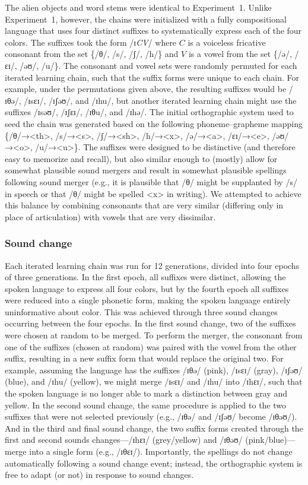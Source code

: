 \documentclass[doc,biblatex]{apa7}
\begin{document}
The alien objects and word stems were identical to Experiment~1. Unlike Experiment~1, however, the chains were initialized with a fully compositional language that uses four distinct suffixes to systematically express each of the four colors. The suffixes took the form /ɪ\textit{CV}/ where $C$ is a voiceless fricative consonant from the set \{/θ/, /s/, /ʃ/, /h/\} and $V$ is a vowel from the set \{/ə/, /ɛɪ/, /əʊ/, /u/\}. The consonant and vowel sets were randomly permuted for each iterated learning chain, such that the suffix forms were unique to each chain. For example, under the permutations given above, the resulting suffixes would be /ɪθə/, /ɪsɛɪ/, /ɪʃəʊ/, and /ɪhu/, but another iterated learning chain might use the suffixes /ɪsəʊ/, /ɪʃɛɪ/, /ɪθu/, and /ɪhə/. The initial orthographic system used to seed the chain was generated based on the following phoneme–grapheme mapping \{/θ/→<th>, /s/→<s>, /ʃ/→<sh>, /h/→<x>, /ə/→<a>, /ɛɪ/→<e>, /əʊ/→<o>, /u/→<u>\}. The suffixes were designed to be distinctive (and therefore easy to memorize and recall), but also similar enough to (mostly) allow for somewhat plausible sound mergers and result in somewhat plausible spellings following sound merger (e.g., it is plausible that /θ/ might be supplanted by /s/ in speech or that /θ/ might be spelled <x> in writing). We attempted to achieve this balance by combining consonants that are very similar (differing only in place of articulation) with vowels that are very dissimilar.

\subsubsection{Sound change}

Each iterated learning chain was run for 12 generations, divided into four epochs of three generations. In the first epoch, all suffixes were distinct, allowing the spoken language to express all four colors, but by the fourth epoch all suffixes were reduced into a single phonetic form, making the spoken language entirely uninformative about color. This was achieved through three sound changes occurring between the four epochs. In the first sound change, two of the suffixes were chosen at random to be merged. To perform the merger, the consonant from one of the suffixes (chosen at random) was paired with the vowel from the other suffix, resulting in a new suffix form that would replace the original two. For example, assuming the language has the suffixes /ɪθə/ (pink), /ɪsɛɪ/ (gray), /ɪʃəʊ/ (blue), and /ɪhu/ (yellow), we might merge /ɪsɛɪ/ and /ɪhu/ into /ɪhɛɪ/, such that the spoken language is no longer able to mark a distinction between gray and yellow. In the second sound change, the same procedure is applied to the two suffixes that were not selected previously (e.g., /ɪθə/ and /ɪʃəʊ/ become /ɪθəʊ/). And in the third and final sound change, the two suffix forms created through the first and second sounds changes---/ɪhɛɪ/ (grey/yellow) and /ɪθəʊ/ (pink/blue)---merge into a single form (e.g., /ɪθɛɪ/). Importantly, the spellings do not change automatically following a sound change event; instead, the orthographic system is free to adapt (or not) in response to sound changes.
\end{document}

